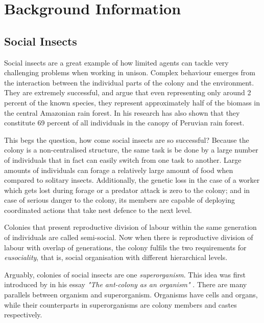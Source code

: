 \chapter{Background Information}
\label{ch:background-information}

\section {Social Insects}

Social insects are a great example of how limited agents can tackle very challenging problems when working in unison. Complex behaviour emerges from the interaction between the individual parts of the colony and the environment. They are extremely successful, and \citeauthor{Fittkau1973} \cite{Fittkau1973} argue that even representing only around 2 percent of the known species, they represent approximately  half of the biomass in the central Amazonian rain forest. In his research \citeauthor{erwin1989} \cite{erwin1989} has also shown that they constitute 69 percent of all individuals in the canopy of Peruvian rain forest.

This begs the question, how come social insects are so successful? Because the colony is a non-centralised structure, the same task is be done by a large number of individuals that in fact can easily switch from one task to another. Large amounts of individuals can forage a relatively large amount of food when compared to solitary insects. Additionally, the genetic loss in the case of a worker which gets lost during forage or a predator attack is zero to the colony; and in case of serious danger to the colony, its members are capable of deploying coordinated actions that take nest defence to the next level.

Colonies that present reproductive division of labour within the same generation of individuals are called semi-social. Now when there is reproductive division of labour with overlap of generations, the colony fulfils the two requirements for \emph{eusociality}, that is, social organisation with different hierarchical levels.   

Arguably, colonies of social insects are one \emph{superorganism}. This idea was first introduced by \citeauthor{JMOR:JMOR1050220206} in his essay \emph{"The ant-colony as an organism"} \cite{JMOR:JMOR1050220206}. There are many parallels between organism and superorganism. Organisms have cells and organs, while their counterparts in superorganisms are colony members and castes respectively. 

